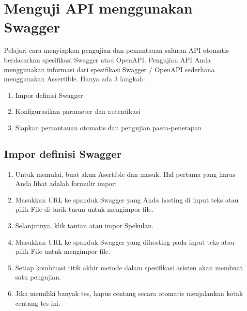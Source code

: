 \documentclass[12pt,a4paper]{article}
\begin{document}
\section{Menguji API menggunakan Swagger}
Pelajari cara menyiapkan pengujian dan pemantauan saluran API otomatis berdasarkan spesifikasi Swagger atau OpenAPI.
Pengujian API Anda menggunakan informasi dari spesifikasi Swagger / OpenAPI sederhana menggunakan Assertible. Hanya ada 3 langkah:
\begin{enumerate}
\item Impor definisi Swagger
\item Konfigurasikan parameter dan autentikasi
\item Siapkan pemantauan otomatis dan pengujian pasca-penerapan
\end{enumerate}

\subsection{Impor definisi Swagger}
\begin{enumerate}
\item Untuk memulai, buat akun Asertible dan masuk. Hal pertama yang harus Anda lihat adalah formulir impor:
\item Masukkan URL ke spanduk Swagger yang Anda hosting di input teks atau pilih File di tarik turun untuk mengimpor file.
\item Selanjutnya, klik tautan atau impor Spekulan.
\item Masukkan URL ke spanduk Swagger yang dihosting pada input teks atau pilih File untuk mengimpor file.
\item Setiap kombinasi titik akhir metode dalam spesifikasi asisten akan membuat satu pengujian.
\item Jika  memiliki banyak tes, hapus centang secara otomatis menjalankan kotak centang tes ini.
\end{enumerate}
\end{document}
